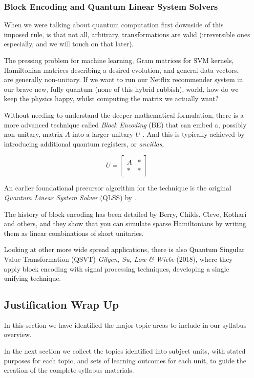 \subsubsection{Block Encoding and Quantum Linear System Solvers}

When we were talking about quantum computation first downside of this imposed rule, is that not all, arbitrary, transformations are valid 
(irreversible ones especially, and we will touch on that later).

The pressing problem for machine learning, Gram matrices for SVM kernels, 
Hamiltonian matrices describing a desired evolution, and general data vectors, are generally non-unitary.
If we want to run our Netflix recommender system in our brave new, fully quantum (none of this hybrid rubbish), world,
how do we keep the physics happy, whilst computing the matrix we actually want?

Without needing to understand the deeper mathematical formulation, 
there is a more advanced technique called \emph{Block Encoding} (BE) 
that can embed a, possibly non-unitary, matrix $A$ into a larger unitary $U$ \cite{Low:2017}.
And this is typically achieved by introducing additional quantum registers, or \emph{ancillas}, 

$$
U = \begin{bmatrix} A & \ast \\ \ast & \ast \end{bmatrix}
$$

An earlier foundational precursor algorithm for the technique is 
the original \emph{Quantum Linear System Solver} (QLSS) by \citeauthor{Harrow:2009} \cite{Harrow:2009}.

The history of block encoding has been detailed by Berry, Childs, Cleve, Kothari and others, 
and they show that you can simulate sparse Hamiltonians by writing them as linear combinations 
of short unitaries.

Looking at other more wide spread applications, 
there is also Quantum Singular Value Transformation (QSVT) \emph{Gilyen, Su, Low \& Wiebe} (2018),
where they apply block encoding with signal processing techniques, developing a single unifying technique.

\subsection{Justification Wrap Up}

In this section we have identified the major topic areas to include in our syllabus overview.

In the next section we collect the topics identified into subject units, with stated purposes for each topic,
and sets of learning outcomes for each unit, to guide the creation of the complete syllabus materials.